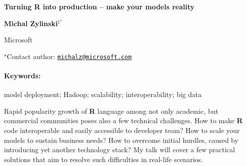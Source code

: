 \documentclass[11pt, a4paper]{article}
\renewcommand{\title}[1]{\begin{center}{\bf \LARGE #1}\end{center}}
\newcommand{\keywords}{\paragraph{Keywords:}}
\begin{document}
\pagestyle{empty}

\title{Turning R into production -- make your models reality}

\begin{center}
  {\bf Michal Zylinski$^{1^\star}$}
\end{center}

\vskip 0.3cm

\begin{affiliations}
\begin{enumerate}
\begin{minipage}{0.915\textwidth}
\centering
\item Microsoft \\[-2pt]
\end{minipage}
\end{enumerate}
$^\star$Contact author: \href{mailto:michalz@microsoft.com}{\nolinkurl{michalz@microsoft.com}}\\
\end{affiliations}

\vskip 0.5cm

\begin{minipage}{0.915\textwidth}
\keywords model deployment; Hadoop; scalability; interoperability; big data
\end{minipage}

\vskip 0.8cm

Rapid popularity growth of \textbf{R} language among not only academic,
but commercial communities poses also a few technical challenges. How to
make \textbf{R} code interoperable and easily accessible to developer
team? How to scale your models to sustain business needs? How to
overcome initial hurdles, caused by introducing yet another technology
stack? My talk will cover a few practical solutions that aim to resolve
such difficulties in real-life scenarios.
\end{document}
